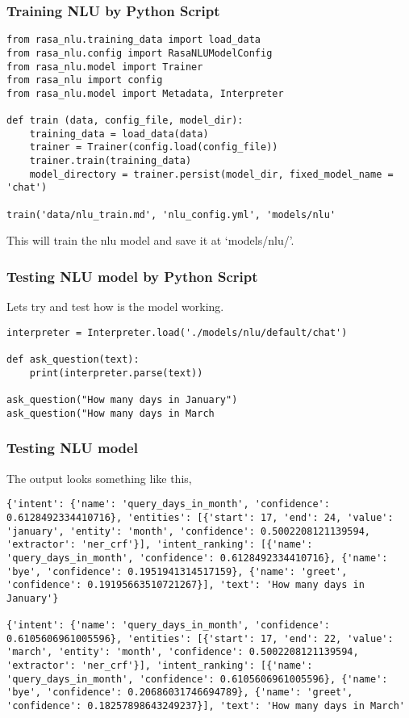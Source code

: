  \begin{frame}[fragile]\frametitle{Training NLU by Python Script}
 
\begin{lstlisting}
from rasa_nlu.training_data import load_data
from rasa_nlu.config import RasaNLUModelConfig
from rasa_nlu.model import Trainer
from rasa_nlu import config
from rasa_nlu.model import Metadata, Interpreter

def train (data, config_file, model_dir):
    training_data = load_data(data)
    trainer = Trainer(config.load(config_file))
    trainer.train(training_data)
    model_directory = trainer.persist(model_dir, fixed_model_name = 'chat')

train('data/nlu_train.md', 'nlu_config.yml', 'models/nlu'
\end{lstlisting}
This will train the nlu model and save it at `models/nlu/'.
\end{frame}

 \begin{frame}[fragile]\frametitle{Testing NLU model by Python Script}
 
Lets try and test how is the model working.

\begin{lstlisting}
interpreter = Interpreter.load('./models/nlu/default/chat')

def ask_question(text):
    print(interpreter.parse(text))

ask_question("How many days in January")
ask_question("How many days in March
\end{lstlisting}

\end{frame}

 \begin{frame}[fragile]\frametitle{Testing NLU model}
The output looks something like this,


\begin{lstlisting}
{'intent': {'name': 'query_days_in_month', 'confidence': 0.6128492334410716}, 'entities': [{'start': 17, 'end': 24, 'value': 'january', 'entity': 'month', 'confidence': 0.5002208121139594, 'extractor': 'ner_crf'}], 'intent_ranking': [{'name': 'query_days_in_month', 'confidence': 0.6128492334410716}, {'name': 'bye', 'confidence': 0.1951941314517159}, {'name': 'greet', 'confidence': 0.19195663510721267}], 'text': 'How many days in January'}

{'intent': {'name': 'query_days_in_month', 'confidence': 0.6105606961005596}, 'entities': [{'start': 17, 'end': 22, 'value': 'march', 'entity': 'month', 'confidence': 0.5002208121139594, 'extractor': 'ner_crf'}], 'intent_ranking': [{'name': 'query_days_in_month', 'confidence': 0.6105606961005596}, {'name': 'bye', 'confidence': 0.20686031746694789}, {'name': 'greet', 'confidence': 0.18257898643249237}], 'text': 'How many days in March'
\end{lstlisting}

\end{frame}

